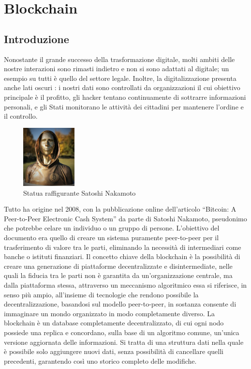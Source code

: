 \chapter{Blockchain}
\section{Introduzione}
Nonostante il grande successo della trasformazione digitale, molti ambiti delle nostre interazioni sono rimasti indietro e non si sono adattati al digitale; un esempio su tutti è quello del settore legale. Inoltre, la digitalizzazione presenta anche lati oscuri \cite{La_quarta_rivoluzione_industriale}: i nostri dati sono controllati da organizzazioni il cui obiettivo principale è il profitto, gli hacker tentano continuamente di sottrarre informazioni personali, e gli Stati monitorano le attività dei cittadini per mantenere l’ordine e il controllo.
\begin{figure} %
    \centering
    \includegraphics[width=0.25\textwidth]{Immagini/Satoshi_Nakamoto.jpg}
    \caption{Statua raffigurante Satoshi Nakamoto}
\end{figure}
Tutto ha origine nel 2008, con la pubblicazione online dell’articolo “Bitcoin: A Peer-to-Peer Electronic Cash System” da parte di Satoshi Nakamoto, pseudonimo che potrebbe celare un individuo o un gruppo di persone. L’obiettivo del documento era quello di creare un sistema puramente peer-to-peer per il trasferimento di valore tra le parti, eliminando la necessità di intermediari come banche o istituti finanziari.
Il concetto chiave della blockchain è la possibilità di creare una generazione di piattaforme decentralizzate e disintermediate, nelle quali la fiducia tra le parti non è garantita da un’organizzazione centrale, ma dalla piattaforma stessa, attraverso un meccanismo algoritmico essa si riferisce, in senso più ampio, all’insieme di tecnologie che rendono possibile la decentralizzazione, basandosi sul modello peer-to-peer, in sostanza consente di immaginare un mondo organizzato in modo completamente diverso.
La blockchain è un database completamente decentralizzato, di cui ogni nodo possiede una replica e concordano, sulla base di un algoritmo comune, un’unica versione aggiornata delle informazioni. Si tratta di una struttura dati nella quale è possibile solo aggiungere nuovi dati, senza possibilità di cancellare quelli precedenti, garantendo così uno storico completo delle modifiche.
